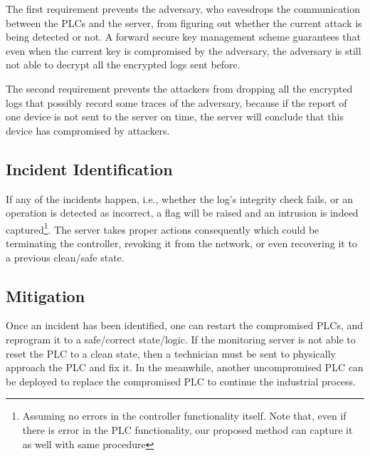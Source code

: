 The first requirement prevents the adversary, who eavesdrops the communication between the PLCs and the server, from figuring out whether the current attack is being detected or not. A forward secure key management scheme guarantees that even when the current key is compromised by the adversary, the adversary is still not able to decrypt all the encrypted logs sent before. 

The second requirement prevents the attackers from dropping all the encrypted logs that possibly record some traces of the adversary, because if the report of one device is not sent to the server on time, the server will conclude that this device has compromised by attackers.

\subsection{Incident Identification}

If any of the incidents happen, i.e., whether the log's integrity check fails, or an operation is detected as incorrect, a flag will be raised and an intrusion is indeed captured\footnote{Assuming no errors in the controller functionality itself. Note that, even if there is error in the PLC functionality, our proposed method can capture it as well with same procedure}. The server takes proper actions consequently which could be terminating the controller, revoking it from the network, or even recovering it to a previous clean/safe state.

%


\subsection{Mitigation}

Once an incident has been identified, one can restart the compromised PLCs, and reprogram it to a safe/correct state/logic. If the monitoring server is not able to reset the PLC to a clean state, then a technician must be sent to physically approach the PLC and fix it. In the meanwhile, another uncompromised PLC can be deployed to replace the compromised PLC to continue the industrial process. 